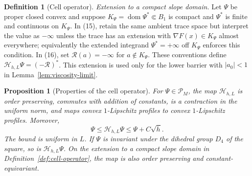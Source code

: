 \documentclass[11pt,reqno]{amsart}
\theoremstyle{plain}
\newtheorem{proposition}[theorem]{Proposition}
\theoremstyle{definition}
\newtheorem{definition}[theorem]{Definition}
\theoremstyle{remark}
\numberwithin{equation}{section}
\newcommand{\1}{\mathbf 1}
\begin{document}
\begin{definition}[Cell operator]
\smallskip\noindent\emph{Extension to a compact slope domain.} Let
$\Psi$ be proper closed convex and suppose
$K_ \Psi=\operatorname {dom}\Psi^*\Subset B_ 1$ is compact and
$\Psi^*$ is finite and continuous on $K_ \Psi$.  In (15), retain the
same ambient trace space but interpret the value as $-\infty$ unless
the trace has an extension with
$\nabla F(x)\in K_ \Psi$ almost everywhere; equivalently the extended
integrand $\Psi^*=+\infty$ off $K_ \Psi$ enforces this condition.
In (16), set $\mathcal R(a)=-\infty$ for $a\notin K_ \Psi$.  These conventions
define $\mathcal H_ {h,L}\Psi=(-\mathcal R)^*$.  This extension is used only
for the lower barrier with $|a_0|<1$ in Lemma~\ref{lem:viscosity-limit}.

\end{definition}

\begin{proposition}[Properties of the cell operator]\label{prop:cell-operator-properties}
For $\Psi\in\mathscr P_M$, the map $\mathcal H_ {h,L}$ is order preserving,
commutes with addition of constants, is a contraction in the uniform
norm, and maps convex $1$-Lipschitz profiles to convex
$1$-Lipschitz profiles.  Moreover,
\begin{equation}
\Psi\leq\mathcal H_ {h,L}\Psi\leq\Psi+C\sqrt h.
\tag{16a}
\end{equation}
The bound is uniform in $L$.  If $\Psi$ is invariant under the dihedral group
$D_ 4$ of the square, so is $\mathcal H_ {h,L}\Psi$.
On the extension to a compact slope domain in Definition~\ref{def:cell-operator},
the map is also order preserving and constant-equivariant.
\end{proposition}
\end{document}
